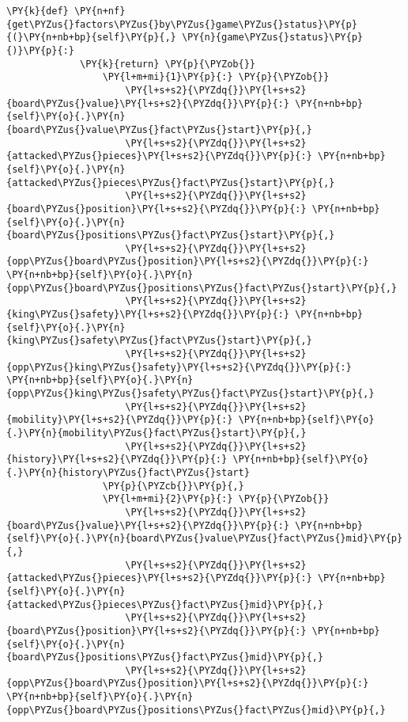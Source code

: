 \begin{Verbatim}[commandchars=\\\{\}]
         \PY{k}{def} \PY{n+nf}{get\PYZus{}factors\PYZus{}by\PYZus{}game\PYZus{}status}\PY{p}{(}\PY{n+nb+bp}{self}\PY{p}{,} \PY{n}{game\PYZus{}status}\PY{p}{)}\PY{p}{:}
             \PY{k}{return} \PY{p}{\PYZob{}}
                 \PY{l+m+mi}{1}\PY{p}{:} \PY{p}{\PYZob{}}
                     \PY{l+s+s2}{\PYZdq{}}\PY{l+s+s2}{board\PYZus{}value}\PY{l+s+s2}{\PYZdq{}}\PY{p}{:} \PY{n+nb+bp}{self}\PY{o}{.}\PY{n}{board\PYZus{}value\PYZus{}fact\PYZus{}start}\PY{p}{,}
                     \PY{l+s+s2}{\PYZdq{}}\PY{l+s+s2}{attacked\PYZus{}pieces}\PY{l+s+s2}{\PYZdq{}}\PY{p}{:} \PY{n+nb+bp}{self}\PY{o}{.}\PY{n}{attacked\PYZus{}pieces\PYZus{}fact\PYZus{}start}\PY{p}{,}
                     \PY{l+s+s2}{\PYZdq{}}\PY{l+s+s2}{board\PYZus{}position}\PY{l+s+s2}{\PYZdq{}}\PY{p}{:} \PY{n+nb+bp}{self}\PY{o}{.}\PY{n}{board\PYZus{}positions\PYZus{}fact\PYZus{}start}\PY{p}{,}
                     \PY{l+s+s2}{\PYZdq{}}\PY{l+s+s2}{opp\PYZus{}board\PYZus{}position}\PY{l+s+s2}{\PYZdq{}}\PY{p}{:} \PY{n+nb+bp}{self}\PY{o}{.}\PY{n}{opp\PYZus{}board\PYZus{}positions\PYZus{}fact\PYZus{}start}\PY{p}{,}
                     \PY{l+s+s2}{\PYZdq{}}\PY{l+s+s2}{king\PYZus{}safety}\PY{l+s+s2}{\PYZdq{}}\PY{p}{:} \PY{n+nb+bp}{self}\PY{o}{.}\PY{n}{king\PYZus{}safety\PYZus{}fact\PYZus{}start}\PY{p}{,}
                     \PY{l+s+s2}{\PYZdq{}}\PY{l+s+s2}{opp\PYZus{}king\PYZus{}safety}\PY{l+s+s2}{\PYZdq{}}\PY{p}{:} \PY{n+nb+bp}{self}\PY{o}{.}\PY{n}{opp\PYZus{}king\PYZus{}safety\PYZus{}fact\PYZus{}start}\PY{p}{,}
                     \PY{l+s+s2}{\PYZdq{}}\PY{l+s+s2}{mobility}\PY{l+s+s2}{\PYZdq{}}\PY{p}{:} \PY{n+nb+bp}{self}\PY{o}{.}\PY{n}{mobility\PYZus{}fact\PYZus{}start}\PY{p}{,}
                     \PY{l+s+s2}{\PYZdq{}}\PY{l+s+s2}{history}\PY{l+s+s2}{\PYZdq{}}\PY{p}{:} \PY{n+nb+bp}{self}\PY{o}{.}\PY{n}{history\PYZus{}fact\PYZus{}start}
                 \PY{p}{\PYZcb{}}\PY{p}{,}
                 \PY{l+m+mi}{2}\PY{p}{:} \PY{p}{\PYZob{}}
                     \PY{l+s+s2}{\PYZdq{}}\PY{l+s+s2}{board\PYZus{}value}\PY{l+s+s2}{\PYZdq{}}\PY{p}{:} \PY{n+nb+bp}{self}\PY{o}{.}\PY{n}{board\PYZus{}value\PYZus{}fact\PYZus{}mid}\PY{p}{,}
                     \PY{l+s+s2}{\PYZdq{}}\PY{l+s+s2}{attacked\PYZus{}pieces}\PY{l+s+s2}{\PYZdq{}}\PY{p}{:} \PY{n+nb+bp}{self}\PY{o}{.}\PY{n}{attacked\PYZus{}pieces\PYZus{}fact\PYZus{}mid}\PY{p}{,}
                     \PY{l+s+s2}{\PYZdq{}}\PY{l+s+s2}{board\PYZus{}position}\PY{l+s+s2}{\PYZdq{}}\PY{p}{:} \PY{n+nb+bp}{self}\PY{o}{.}\PY{n}{board\PYZus{}positions\PYZus{}fact\PYZus{}mid}\PY{p}{,}
                     \PY{l+s+s2}{\PYZdq{}}\PY{l+s+s2}{opp\PYZus{}board\PYZus{}position}\PY{l+s+s2}{\PYZdq{}}\PY{p}{:} \PY{n+nb+bp}{self}\PY{o}{.}\PY{n}{opp\PYZus{}board\PYZus{}positions\PYZus{}fact\PYZus{}mid}\PY{p}{,}

\end{Verbatim}
